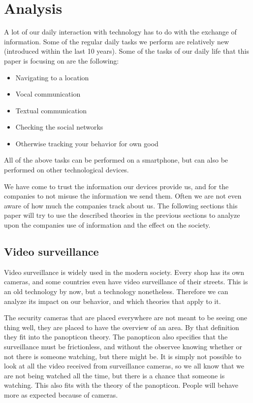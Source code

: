 \section{Analysis}
A lot of our daily interaction with technology has to do with the exchange of information. Some of the regular daily tasks we perform are relatively new (introduced within the last 10 years). Some of the tasks of our daily life that this paper is focusing on are the following:
\begin{itemize}
  \item{Navigating to a location}
  \item{Vocal communication}
  \item{Textual communication}
  \item{Checking the social networks}
  \item{Otherwise tracking your behavior for own good}
\end{itemize}

All of the above tasks can be performed on a smartphone, but can also be performed on other technological devices.

We have come to trust the information our devices provide us, and for the companies to not misuse the information we send them. Often we are not even aware of how much the companies track about us. The following sections this paper will try to use the described theories in the previous sections to analyze upon the companies use of information and the effect on the society.

\subsection{Video surveillance}
Video surveillance is widely used in the modern society. Every shop has its own cameras, and some countries even have video surveillance of their streets. This is an old technology by now, but a technology nonetheless. Therefore we can analyze its impact on our behavior, and which theories that apply to it.

The security cameras that are placed everywhere are not meant to be seeing one thing well, they are placed to have the overview of an area. By that definition they fit into the panopticon theory. The panopticon also specifies that the surveillance must be frictionless, and without the observee knowing whether or not there is someone watching, but there might be. It is simply not possible to look at all the video received from surveillance cameras, so we all know that we are not being watched all the time, but there is a chance that someone is watching. This also fits with the theory of the panopticon. People will behave more as expected because of cameras.

